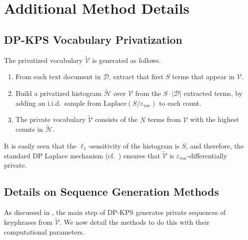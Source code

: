 \section{Additional Method Details}


\subsection{DP-KPS Vocabulary Privatization}
The privatized vocabulary $\widetilde{\mathcal V}$ is generated as follows. 
\begin{enumerate}
 \item From each text document in $\mathcal{D}$, extract that first $S$ terms that appear in $\mathcal{V}$. %
 \item Build a privatized histogram $\widetilde{\mathcal{H}}$ over $\mathcal{V}$ from the $S\cdot|\mathcal{D}|$ extracted terms, by adding an i.i.d.~sample from $\mathrm{Laplace}(S/\varepsilon_{\mathrm{voc}})$ to each count.
 \item The private vocabulary $\widetilde{\mathcal{V}}$ consists of the $N$ terms from $\mathcal{V}$ with the highest counts in $\widetilde{\mathcal{H}}$.
\end{enumerate}
It is easily seen that the $\ell_1$-sensitivity of the histogram is $S$, and therefore, the standard DP Laplace mechanism (cf.~\cite{dwork2014algorithmic}) ensures that $\widetilde{\mathcal{V}}$ is $\varepsilon_{\mathrm{voc}}$-differentially private.

\subsection{Details on Sequence Generation Methods}\label{sec:seqgen_appendix}
As discussed in , the main step of DP-KPS generates private sequences of keyphrases from $\widetilde{\mathcal{V}}$. We now detail the methods to do this with their computational parameters. 

